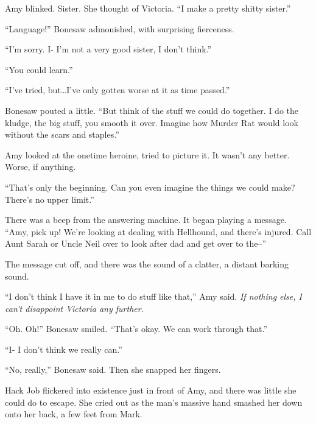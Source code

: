 Amy blinked.  Sister.  She thought of Victoria.  ``I make a pretty shitty sister.''



``Language!''  Bonesaw admonished, with surprising fierceness.



``I'm sorry.  I- I'm not a very good sister, I don't think.''



``You could learn.''



``I've tried, but\ldots I've only gotten worse at it as time passed.''



Bonesaw pouted a little.  ``But think of the stuff we could do together.  I do the kludge, the big stuff, you smooth it over.  Imagine how Murder Rat would look without the scars and staples.''



Amy looked at the onetime heroine, tried to picture it.  It wasn't any better.  Worse, if anything.



``That's only the beginning.  Can you even imagine the things we could make?  There's no upper limit.''



There was a beep from the answering machine.  It began playing a message.  ``Amy, pick up!  We're looking at dealing with Hellhound, and there's injured.  Call Aunt Sarah or Uncle Neil over to look after dad and get over to the--''



The message cut off, and there was the sound of a clatter, a distant barking sound.



``I don't think I have it in me to do stuff like that,'' Amy said.  \emph{If nothing else, I can't disappoint Victoria any further}.



``Oh.  Oh!''  Bonesaw smiled.  ``That's okay.  We can work through that.''



``I- I don't think we really can.''



``No, really,'' Bonesaw said.  Then she snapped her fingers.



Hack Job flickered into existence just in front of Amy, and there was little she could do to escape.  She cried out as the man's massive hand smashed her down onto her back, a few feet from Mark.



